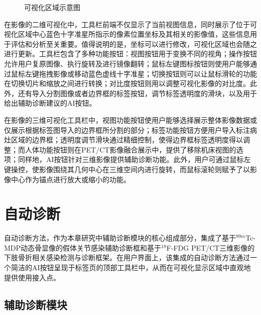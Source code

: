 \begin{figure}[htbp]
{        \label{fig:chap05_view_3D}
    }
    \newline
    \caption{可视化区域示意图}\label{fig:chap05_view}
\end{figure}

在影像的二维可视化中，工具栏前端不仅显示了当前视图信息，同时展示了位于可视化区域中心蓝色十字准星所指示的像素位置坐标及其相关的影像值，这些信息用于评估和分析至关重要。值得说明的是，坐标可以进行修改，可视化区域也会随之进行更新。工具栏包含了多种功能按钮：视图按钮用于变换不同的视角；操作按钮允许用户复原图像、执行旋转及进行镜像翻转；鼠标左键图标按钮则使用户能够通过鼠标左键拖拽影像或移动蓝色虚线十字准星；切换按钮则可以让鼠标滑轮的功能在切换切片和缩放之间进行转换；对比度按钮则用以调整可视化影像的对比度。此外，还有导入分割图像或者边界框的标签按钮，调节标签透明度的滑块，以及用于给出辅助诊断建议的AI按钮。

在影像的三维可视化工具栏中，视图功能按钮使用户能够选择展示整体影像数据或仅展示根据标签图导入的边界框所分割的部分；标签功能按钮方便用户导入标注病灶区域的边界框；透明度调节滑块通过精细控制，使得边界框标签透明度得以调整；而人体功能按钮则在PET/CT影像融合展示中，提供了移除机床视图的选项；同样地，AI按钮针对三维影像提供辅助诊断功能。此外，用户可通过鼠标左键操控，使影像围绕其几何中心在三维空间内进行旋转，而鼠标滚轮则赋予了以影像中心作为锚点进行放大或缩小的功能。

\section{自动诊断}


自动诊断方法，作为本章研究中辅助诊断模块的核心组成部分，集成了基于\(^{99m}\)Tc-MDP动态骨显像的假体关节感染辅助诊断框和基于\(^{18}\)F-FDG PET/CT三维影像的下肢骨折相关感染检测与诊断框架。在用户界面上，该集成的自动诊断方法通过一个简洁的AI按钮呈现于标签页的顶部工具栏中，从而在可视化显示区域中直观地提供使用接入点。

\subsection{辅助诊断模块}

